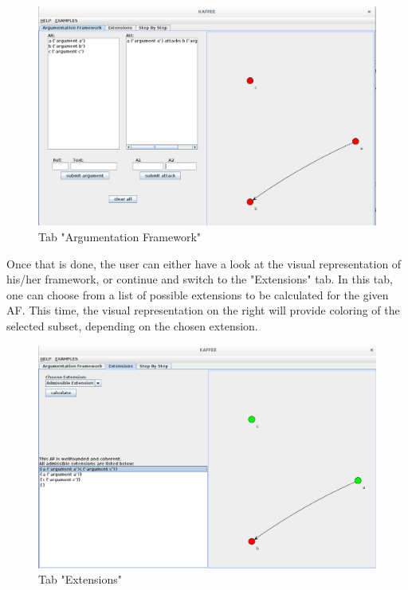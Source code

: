 \documentclass[12pt]{report}
\numberwithin{figure}{chapter}
\theoremstyle{break}
\begin{document}
\bigskip
\begin{figure}[h!]
	\begin{center}\includegraphics[scale=0.35]{Images/Screenshot_KAFFEE_Tab1.png}
	\end{center}
\caption{Tab "Argumentation Framework"}
\end{figure}

\newpage

Once that is done, the user can either have a look at the visual representation of his/her framework, or continue and switch to the "Extensions" tab.
In this tab, one can choose from a list of possible extensions to be calculated for the given AF. This time, the visual representation on the right will
provide coloring of the selected subset, depending on the chosen extension.\\

\bigskip
\begin{figure}[h!]
	\begin{center}\includegraphics[scale=0.35]{Images/Screenshot_KAFFEE_Tab2.png}
	\end{center}
\caption{Tab "Extensions"}
\end{figure}
\end{document}
